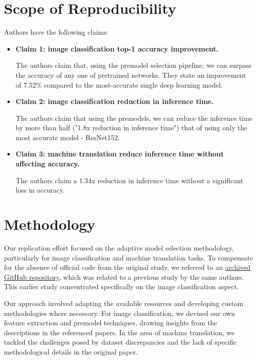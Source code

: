 \section{Scope of Reproducibility}
Authors have the following claims:
\begin{itemize}
	\item \textbf{Claim 1: image classification top-1 accuracy improvement.}
	      
	      The authors claim that, using the premodel selection pipeline, we can surpass the accuracy of any one of pretrained networks. They state an improvement of 7.52\% compared to the most-accurate single deep learning model.
	      
	\item \textbf{Claim 2: image classification reduction in inference time.}
	      
	      The authors claim that using the premodels, we can reduce the inference time by more than half ("1.8x reduction in inference time") that of using only the most accurate model - ResNet152.
	      
	\item \textbf{Claim 3: machine translation reduce inference time without affecting accuracy.}
	      
	      The authors claim a 1.34x reduction in inference time without a significant loss in accuracy.
	      
\end{itemize}


\section{Methodology}

Our replication effort focused on the adaptive model selection methodology, particularly for image classification and machine translation tasks. To compensate for the absence of official code from the original study, we referred to an \href{https://github.com/qwerybot/Adaptive_Deep_Learning}{archived GitHub repository}, which was related to a previous study\supercite{taylor2018adaptive} by the same authors. This earlier study concentrated specifically on the image classification aspect.

Our approach involved adapting the available resources and developing custom methodologies where necessary. For image classification, we devised our own feature extraction and premodel techniques, drawing insights from the descriptions in the referenced papers. In the area of machine translation, we tackled the challenges posed by dataset discrepancies and the lack of specific methodological details in the original paper.

